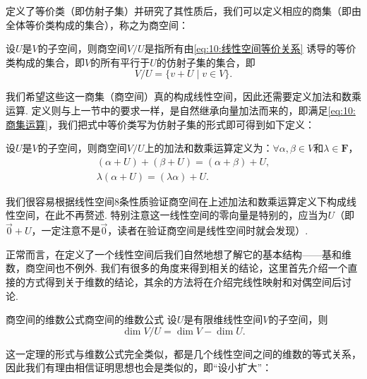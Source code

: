 定义了等价类（即仿射子集）并研究了其性质后，我们可以定义相应的商集（即由全体等价类构成的集合），称之为商空间：
\begin{definition}{}{}
    设$U$是$V$的子空间，则商空间$V/U$是指所有由\autoref{eq:10:线性空间等价关系} 诱导的等价类构成的集合，即$V$的所有平行于$U$的仿射子集的集合，即
    \[V/U=\{v+U \mid v\in V\}.\]
\end{definition}
我们希望这些这一商集（商空间）真的构成线性空间，因此还需要定义加法和数乘运算. 定义则与上一节中的要求一样，是自然继承向量加法而来的，即满足\autoref{eq:10:商集运算}，我们把式中等价类写为仿射子集的形式即可得到如下定义：
\begin{definition}{}{}
    设$U$是$V$的子空间，则商空间$V/U$上的加法和数乘运算定义为：$\forall \alpha,\beta\in V$和$\lambda\in\mathbf{F}$，
    \begin{gather*}
        (\alpha+U)+(\beta+U)=(\alpha+\beta)+U, \\
        \lambda(\alpha+U)=(\lambda\alpha)+U.
    \end{gather*}
\end{definition}
我们很容易根据线性空间8条性质验证商空间在上述加法和数乘运算定义下构成线性空间，在此不再赘述. 特别注意这一线性空间的零向量是特别的，应当为$U$（即$\vec{0}+U$，一定注意不是$\vec{0}$，读者在验证商空间是线性空间时就会发现）.

正常而言，在定义了一个线性空间后我们自然地想了解它的基本结构——基和维数，商空间也不例外. 我们有很多的角度来得到相关的结论，这里首先介绍一个直接的方式得到关于维数的结论，其余的方法将在介绍完线性映射和对偶空间后讨论.

\begin{theorem}{商空间的维数公式}{商空间的维数公式}
    设$U$是有限维线性空间$V$的子空间，则
    \[\dim V/U=\dim V-\dim U.\]
\end{theorem}

这一定理的形式与维数公式完全类似，都是几个线性空间之间的维数的等式关系，因此我们有理由相信证明思想也会是类似的，即``设小扩大''：

